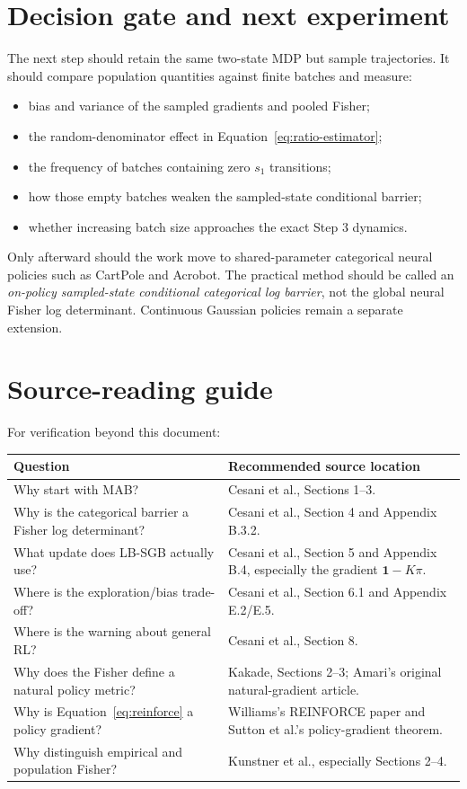 \documentclass[10pt,a4paper]{article}
\begin{document}
\section{Decision gate and next experiment}

The next step should retain the same two-state MDP but sample trajectories.
It should compare population quantities against finite batches and measure:
\begin{itemize}
\item bias and variance of the sampled gradients and pooled Fisher;
\item the random-denominator effect in Equation~\eqref{eq:ratio-estimator};
\item the frequency of batches containing zero $s_1$ transitions;
\item how those empty batches weaken the sampled-state conditional barrier;
\item whether increasing batch size approaches the exact Step 3 dynamics.
\end{itemize}

Only afterward should the work move to shared-parameter categorical neural
policies such as CartPole and Acrobot.  The practical method should be called
an \emph{on-policy sampled-state conditional categorical log barrier}, not the
global neural Fisher log determinant.  Continuous Gaussian policies remain a
separate extension.

\section{Source-reading guide}

For verification beyond this document:
\begin{center}\small
\begin{tabularx}{\textwidth}{lX}
\toprule
Question & Recommended source location\\ \midrule
Why start with MAB? & Cesani et al., Sections 1--3.\\
Why is the categorical barrier a Fisher log determinant? & Cesani et al.,
Section 4 and Appendix B.3.2.\\
What update does LB-SGB actually use? & Cesani et al., Section 5 and Appendix
B.4, especially the gradient $\mathbf1-K\pi$.\\
Where is the exploration/bias trade-off? & Cesani et al., Section 6.1 and
Appendix E.2/E.5.\\
Where is the warning about general RL? & Cesani et al., Section 8.\\
Why does the Fisher define a natural policy metric? & Kakade, Sections 2--3;
Amari's original natural-gradient article.\\
Why is Equation~\eqref{eq:reinforce} a policy gradient? & Williams's REINFORCE
paper and Sutton et al.'s policy-gradient theorem.\\
Why distinguish empirical and population Fisher? & Kunstner et al., especially
Sections 2--4.\\ \bottomrule
\end{tabularx}
\end{center}
\end{document}
